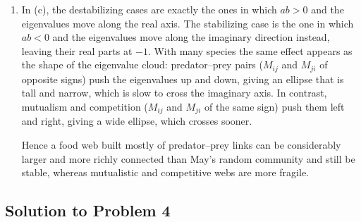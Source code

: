 \documentclass[a4paper,12pt]{article}
\begin{document}
\begin{enumerate}[label=(\alph*)]
\item In (c), the destabilizing cases are exactly the ones in which $ab>0$ and the eigenvalues move along the real axis. The stabilizing case is the one in which $ab<0$ and the eigenvalues move along the imaginary direction instead, leaving their real parts at $-1$. With many species the same effect appears as the shape of the eigenvalue cloud: predator--prey pairs ($M_{ij}$ and $M_{ji}$ of opposite signs) push the eigenvalues up and down, giving an ellipse that is tall and narrow, which is slow to cross the imaginary axis. In contrast, mutualism and competition ($M_{ij}$ and $M_{ji}$ of the same sign) push them left and right, giving a wide ellipse, which crosses sooner.

Hence a food web built mostly of predator--prey links can be considerably larger and more richly connected than May's random community and still be stable, whereas mutualistic and competitive webs are more fragile.
\end{enumerate}

\subsection*{Solution to Problem 4}
\end{document}
